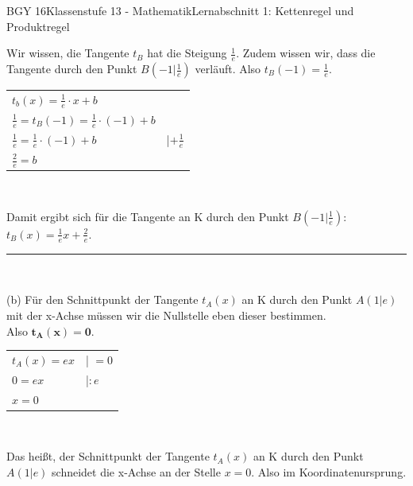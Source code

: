 \documentclass[oneside,openany,headings=optiontotoc,11pt,numbers=noenddot]{scrreprt}
\begin{document}
\begin{worksheet}{BGY 16}{Klassenstufe 13 - Mathematik}{Lernabschnitt 1: Kettenregel und Produktregel}
\begin{framed}
			Wir wissen, die Tangente \(t_B\) hat die Steigung \(\frac{1}{e}\). Zudem wissen wir, dass die Tangente durch den Punkt \(B(-1|\frac{1}{e})\) verläuft. Also \(t_B(-1) = \frac{1}{e}\).\\
			\par\noindent
			\begin{tabularx}{\textwidth}{Xl}
				\(t_b(x) = \frac{1}{e}\cdot{}x + b\)\\
				\(\frac{1}{e} = t_B(-1) = \frac{1}{e}\cdot{}(-1) + b\)\\
				\(\frac{1}{e} = \frac{1}{e}\cdot{}(-1) + b\) & |\(+\frac{1}{e}\)\\
				\colorbox{green!5}{\(\frac{2}{e} = b\)}
			\end{tabularx}\\
			\par\noindent
			Damit ergibt sich für die Tangente an K durch den Punkt \(B(-1|\frac{1}{e})\): \colorbox{green!10}{\(t_B(x) = \frac{1}{e}x + \frac{2}{e}\)}.\\
			\par\noindent
			\rule{\textwidth}{0.1pt}\\
			\par\noindent
			(b) Für den Schnittpunkt der Tangente \(t_A(x)\) an K durch den Punkt \(A(1|e)\) mit der x-Achse müssen wir die Nullstelle eben dieser bestimmen.\\
			Also \(\mathbf{t_A(x) = 0}\).\\
			\par\noindent
			\begin{tabularx}{\textwidth}{Xl}
				\(t_A(x) = ex\) & | \(= 0\)\\
				\(0 = ex\) & |\(:e\)\\
				\colorbox{green!10}{\(x = 0\)}
			\end{tabularx}\\
			\par\noindent
			Das heißt, der Schnittpunkt der Tangente \(t_A(x)\) an K durch den Punkt \(A(1|e)\) schneidet die x-Achse an der Stelle \colorbox{green!10}{\(x = 0\)}. Also im Koordinatenursprung.
		\end{framed}
	\end{worksheet}
\end{document}
